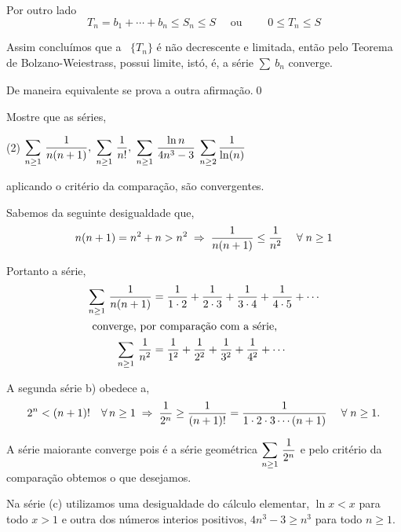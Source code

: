 Por outro lado
\begin{equation*}
T_n=b_1+\cdots+b_n\le S_n\le S \quad \text{ ou }\qquad 0\le T_n\le S
\end{equation*}

Assim concluímos que a \seq\ $\{T_n\}$ \'{e} n\~{a}o decrescente e
limitada, ent\~{a}o pelo Teorema de Bolzano-Weiestrass, possui limite,
ist\'{o}, \'{e}, a s\'{e}rie  $\sum_{}\,b_{n}$ converge.

De maneira equivalente se prova a outra afirma\c{c}\~{a}o.\qed

\begin{exer}
Mostre que as s\'{e}ries,
\begin{tasks}[label=(\alph*),item-indent=6em,label-width=4ex,ref=(\alph*)](2)
\task  \(\displaystyle \sum_{n\geq1}\,\frac{1}{n(n+1)},\)
\task  \(\displaystyle \sum_{n\geq1}\,\frac{1}{n!},\)
\task  \(\displaystyle\sum_{n\geq1}\,\frac{\ln n}{4n^3-3}\)
\task  \(\displaystyle \sum_{n\geq 2}\frac{1}{\ln(n)}\)
\end{tasks}
aplicando o crit\'{e}rio da compara\c{c}\~{a}o, s\~{a}o convergentes.
\end{exer}

\solo Sabemos da seguinte desigualdade que,
\begin{equation*}
  n(n+1)=n^2+n>n^2\;\Rightarrow\; \frac{1}{n(n+1)}\leq
  \frac{1}{n^2}\quad\;\forall\;n\geq 1
\end{equation*}

Portanto a s\'{e}rie,
\begin{align*}
\sum_{n\geq1}\,\frac{1}{n(n+1)} &= \frac{1}{1\cdot
2}+\frac{1}{2\cdot 3}+\frac{1}{3\cdot 4}
  +\frac{1}{4\cdot 5}+\cdots\\
  \intertext{ converge, por compara\c{c}\~{a}o com a s\'{e}rie, }
  \sum_{n\geq1}\,\frac{1}{n^2} & =\frac{1}{1^2}+\frac{1}{2^2}+\frac{1}{3^2}+
  \frac{1}{4^2}+\cdots
\end{align*}

A segunda s\'{e}rie b) obedece a,
\begin{equation*}
  2^n<(n+1)!\quad\forall\, n\geq 1\;\Rightarrow\; \frac{1}{2^n}\geq
  \frac{1}{(n+1)!}=\frac{1}{1\cdot 2\cdot 3\cdots(n+1)}\quad\;\forall\;n\geq
  1.
\end{equation*}

A s\'{e}rie maiorante converge pois \'{e} a s\'{e}rie geom\'{e}trica
$\displaystyle{\sum_{n\geq1}\,\frac{1}{2^n}}$ e pelo crit\'{e}rio da compara\c{c}\~{a}o
obtemos o que desejamos.

Na s\'{e}rie (c) utilizamos uma desigualdade do c\'{a}lculo elementar, $\ln
x < x$ para todo $x>1$ e outra dos n\'{u}meros interios positivos,
$4n^3-3 \ge n^3$ para todo $n\ge 1$.

